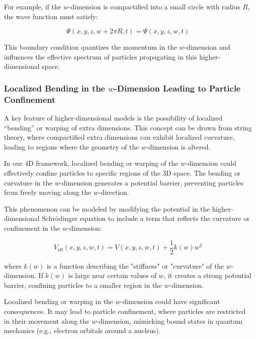 \documentclass[12pt]{article}
\begin{document}
For example, if the \( w \)-dimension is compactified into a small circle with radius \( R \), the wave function must satisfy:

\begin{equation}
\Psi(x, y, z, w + 2\pi R, t) = \Psi(x, y, z, w, t)
\end{equation}

This boundary condition quantizes the momentum in the \( w \)-dimension and influences the effective spectrum of particles propagating in this higher-dimensional space.

\subsubsection{Localized Bending in the \( w \)-Dimension Leading to Particle Confinement}

A key feature of higher-dimensional models is the possibility of localized “bending” or warping of extra dimensions. This concept can be drawn from string theory, where compactified extra dimensions can exhibit localized curvature, leading to regions where the geometry of the \( w \)-dimension is altered.

In our 4D framework, localized bending or warping of the \( w \)-dimension could effectively confine particles to specific regions of the 3D space. The bending or curvature in the \( w \)-dimension generates a potential barrier, preventing particles from freely moving along the \( w \)-direction.

This phenomenon can be modeled by modifying the potential in the higher-dimensional Schrödinger equation to include a term that reflects the curvature or confinement in the \( w \)-dimension:

\begin{equation}
V_{\text{eff}}(x, y, z, w, t) = V(x, y, z, w, t) + \frac{1}{2} k(w) w^2
\end{equation}

where \( k(w) \) is a function describing the "stiffness" or "curvature" of the \( w \)-dimension. If \( k(w) \) is large near certain values of \( w \), it creates a strong potential barrier, confining particles to a smaller region in the \( w \)-dimension.

Localized bending or warping in the \( w \)-dimension could have significant consequences. It may lead to particle confinement, where particles are restricted in their movement along the \( w \)-dimension, mimicking bound states in quantum mechanics (e.g., electron orbitals around a nucleus).
\end{document}
